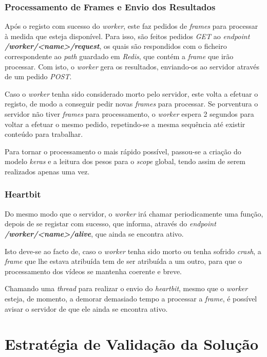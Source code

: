 \documentclass[10pt,portuguese]{article}
\begin{document}
\subsubsection{Processamento de Frames e Envio dos Resultados}
\par Após o registo com sucesso do \textit{worker}, este faz pedidos de \textit{frames} para processar à medida que esteja disponível. Para isso, são feitos pedidos \textit{GET} ao \textit{endpoint \textbf{/worker/<name>/request}}, os quais são respondidos com o ficheiro correspondente ao \textit{path} guardado em \textit{Redis}, que contém a \textit{frame} que irão processar. Com isto, o \textit{worker} gera os resultados, enviando-os ao servidor através de um pedido \textit{POST}. 
\par Caso o \textit{worker} tenha sido considerado morto pelo servidor, este volta a efetuar o registo, de modo a conseguir pedir novas \textit{frames} para processar. Se porventura o servidor não tiver \textit{frames} para processamento, o \textit{worker} espera 2 segundos para voltar a efetuar o mesmo pedido, repetindo-se a mesma sequência até existir conteúdo para trabalhar.
\par Para tornar o processamento o mais rápido possível, passou-se a criação do modelo \textit{keras} e a leitura dos pesos para o \textit{scope} global, tendo assim de serem realizados apenas uma vez. 

\subsubsection{Heartbit}
\par Do mesmo modo que o servidor, o \textit{worker} irá chamar periodicamente uma função, depois de se registar com sucesso, que informa, através do \textit{endpoint \textbf{/worker/<name>/alive}}, que ainda se encontra ativo.
\par Isto deve-se ao facto de, caso o \textit{worker} tenha sido morto ou tenha sofrido \textit{crash}, a \textit{frame} que lhe estava atribuída tem de ser atribuída a um outro, para que o processamento dos vídeos se mantenha coerente e breve.
\par Chamando uma \textit{thread} para realizar o envio do \textit{heartbit}, mesmo que o \textit{worker} esteja, de momento, a demorar demasiado tempo a processar a \textit{frame}, é possível avisar o servidor de que ele ainda se encontra ativo.

\section{Estratégia de Validação da Solução}
\end{document}
